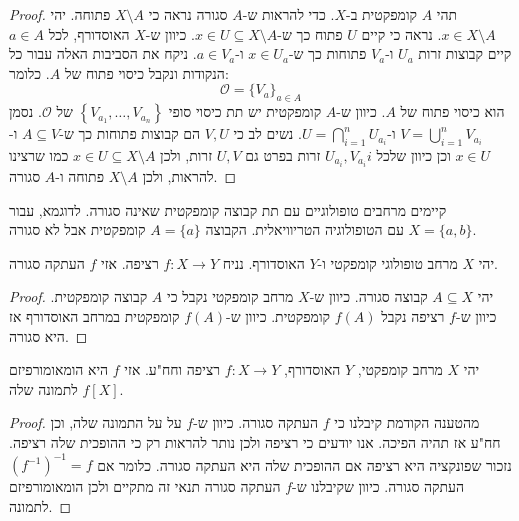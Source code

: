 \documentclass{tstextbook}
\begin{document}
\begin{proof}
תהי \(A\) קומפקטית ב-\(X\). כדי להראות ש-\(A\) סגורה נראה כי \(X\setminus A\) פתוחה. יהי \(x \in X\setminus A\). נראה כי קיים \(U\) פתוח כך ש-\(x \in U\subseteq X \setminus A\). כיוון ש-\(X\) האוסדורף, לכל \(a \in A\) קיים קבוצות זרות \(U_{a}\) ו-\(V_{a}\) פתוחות כך ש-\(x \in U_{a}\) ו-\(a \in V_{a}\). ניקח את הסביבות האלה עבור כל הנקודות ונקבל כיסוי פתוח של \(A\). כלומר:
$$\mathcal{O} =\{ V_{a} \}_{a \in A}$$
הוא כיסוי פתוח של \(A\). כיוון ש-\(A\) קומפקטית יש תת כיסוי סופי \(\left\{  V_{a_{1}},\dots,V_{a_{n}}  \right\}\) של \(\mathcal{O}\). נסמן \(V=\bigcup_{i=1}^{n}V_{a_{i}}\) ו-\(U=\bigcap_{i=1}^{n}U_{a_{i}}\). נשים לב כי \(V,U\) הם קבוצות פתוחות כך ש-\(A\subseteq V\) ו-\(x \in U\) וכן כיוון שלכל \(i\)\(U_{a_{i}},V_{a_{i}}\) זרות בפרט גם \(U,V\) זרות, ולכן \(x \in U \subseteq X \setminus A\) כמו שרצינו להראות, ולכן \(X\setminus A\) פתוחה ו-\(A\) סגורה.

\end{proof}
\begin{remark}
קיימים מרחבים טופולוגיים עם תת קבוצה קומפקטית שאינה סגורה. לדוגמא, עבור \(X=\{ a,b \}\) עם הטופולוגיה הטריוויאלית. הקבוצה \(A=\{ a \}\) קומפקטית אבל לא סגורה.

\end{remark}
\begin{proposition}
יהי \(X\) מרחב טופולוגי קומפקטי ו-\(Y\) האוסדורף. נניח \(f:X\to Y\) רציפה. אזי \(f\) העתקה סגורה. 

\end{proposition}
\begin{proof}
יהי \(A\subseteq X\) קבוצה סגורה. כיוון ש-\(X\) מרחב קומפקטי נקבל כי \(A\) קבוצה קומפקטית. כיוון ש-\(f\) רציפה נקבל \(f(A)\) קומפקטית. כיוון ש-\(f(A)\) קומפקטית במרחב האוסדורף אז היא סגורה.

\end{proof}
\begin{corollary}
יהי \(X\) מרחב קומפקטי, \(Y\) האוסדורף, \(f:X\to Y\) רציפה וחח"ע. אזי \(f\) היא הומאומורפיזם לתמונה שלה \(f[X]\).

\end{corollary}
\begin{proof}
מהטענה הקודמת קיבלנו כי \(f\) העתקה סגורה. כיוון ש-\(f\) על על התמונה שלה, וכן חח"ע אז תהיה הפיכה. אנו יודעים כי רציפה ולכן נותר להראות רק כי ההופכית שלה רציפה. נזכור שפונקציה היא רציפה אם ההופכית שלה היא העתקה סגורה. כלומר אם \((f^{-1})^{-1}=f\) העתקה סגורה. כיוון שקיבלנו ש-\(f\) העתקה סגורה תנאי זה מתקיים ולכן הומאומורפיזם לתמונה.

\end{proof}
\end{document}
